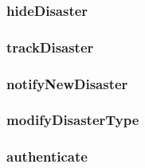 \subsubsection{hideDisaster}
\subsubsection {trackDisaster}
\subsubsection{notifyNewDisaster}
\subsubsection{modifyDisasterType}
\subsubsection{authenticate}
